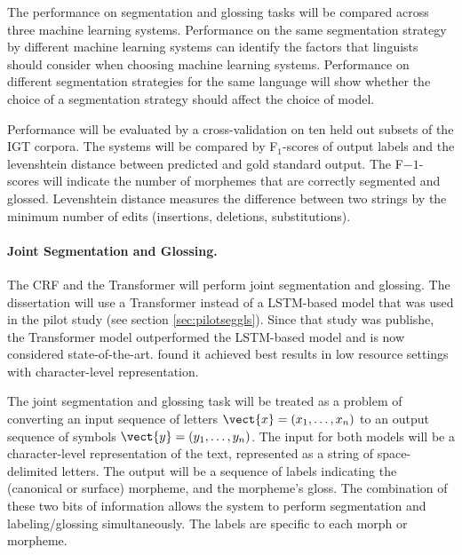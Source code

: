 The performance on segmentation and glossing tasks will be compared across three machine learning systems.  Performance on the same segmentation strategy by different machine learning systems can identify the factors that linguists should consider when choosing machine learning systems. Performance on different segmentation strategies for the same language will show whether the choice of a segmentation strategy should affect the choice of model.  

Performance will be evaluated by a cross-validation on ten held out subsets of the IGT corpora. The systems will be compared by F$_1$-scores of output labels and the levenshtein distance between predicted and gold standard output. 
The F$-1$-scores will indicate the number of morphemes that are correctly segmented and glossed. Levenshtein distance measures the difference between two strings by the minimum number of edits (insertions, deletions, substitutions). 

\paragraph{Joint Segmentation and Glossing.}
The CRF and the Transformer will perform joint segmentation and glossing. The dissertation will use a Transformer instead of a LSTM-based model that was used in the pilot study (see section \ref{sec:pilotseggls}). Since that study was publishe, the Transformer model outperformed the LSTM-based model and is now considered state-of-the-art. \cite{wu2020applying} found it achieved best results in low resource settings with character-level representation. 


The joint segmentation and glossing task will be treated as a problem of converting an input sequence of letters $\vect{x} = (x_1, \ldots, x_n)$ to an output sequence of symbols $\vect{y} = (y_1, \ldots, y_n)$. The input for both models will be a character-level representation of the text, represented as a string of space-delimited letters. The output will be a sequence of labels indicating the (canonical or surface) morpheme, and the morpheme's gloss. The combination of these two bits of information allows the system to perform segmentation and labeling/glossing simultaneously. The labels are specific to each morph or morpheme. %


